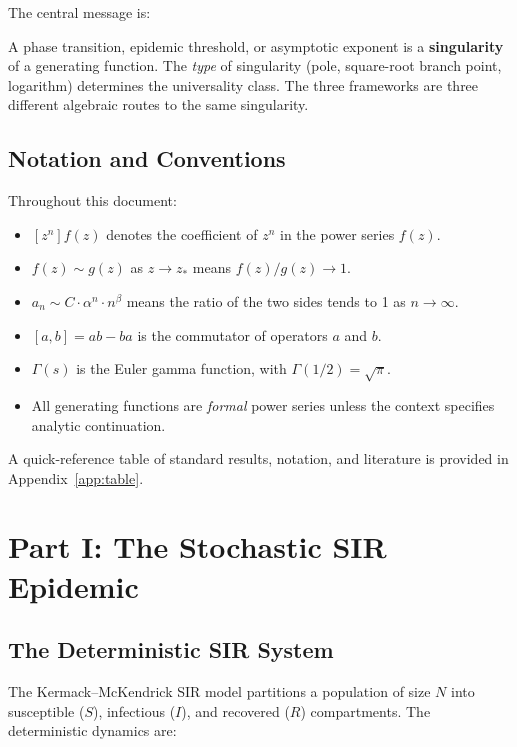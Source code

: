 \documentclass[11pt,a4paper]{article}
\theoremstyle{definition}
\begin{document}
The central message is:

\begin{keybox}
A phase transition, epidemic threshold, or asymptotic exponent is a
\textbf{singularity} of a generating function. The \emph{type} of singularity
(pole, square-root branch point, logarithm) determines the universality class.
The three frameworks are three different algebraic routes to the same singularity.
\end{keybox}

\subsection{Notation and Conventions}

Throughout this document:
\begin{itemize}[leftmargin=2em]
  \item $[z^n] f(z)$ denotes the coefficient of $z^n$ in the power series $f(z)$.
  \item $f(z) \sim g(z)$ as $z\to z_*$ means $f(z)/g(z)\to 1$.
  \item $a_n \sim C \cdot \alpha^n \cdot n^\beta$ means the ratio of the two sides
        tends to 1 as $n\to\infty$.
  \item $[a,b] = ab - ba$ is the commutator of operators $a$ and $b$.
  \item $\Gamma(s)$ is the Euler gamma function, with $\Gamma(1/2)=\sqrt{\pi}$.
  \item All generating functions are \emph{formal} power series unless the context
        specifies analytic continuation.
\end{itemize}

A quick-reference table of standard results, notation, and literature is provided
in Appendix~\ref{app:table}.

\clearpage

\section{Part I: The Stochastic SIR Epidemic}
\label{sec:sir}

\subsection{The Deterministic SIR System}

The Kermack--McKendrick SIR model \cite{kermack1927} partitions a population of
size $N$ into susceptible ($S$), infectious ($I$), and recovered ($R$) compartments.
The deterministic dynamics are:
\end{document}
